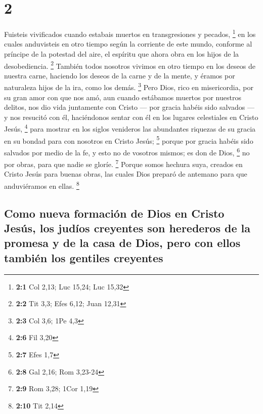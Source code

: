 \hypertarget{section-1}{%
\section{2}\label{section-1}}

 Fuisteis vivificados cuando estabais muertos en
transgresiones y pecados, \footnote{\textbf{2:1} Col 2,13; Luc 15,24;
  Luc 15,32}  en los cuales anduvisteis en otro tiempo
según la corriente de este mundo, conforme al príncipe de la potestad
del aire, el espíritu que ahora obra en los hijos de la desobediencia.
\footnote{\textbf{2:2} Tit 3,3; Efes 6,12; Juan 12,31} 
También todos nosotros vivimos en otro tiempo en los deseos de nuestra
carne, haciendo los deseos de la carne y de la mente, y éramos por
naturaleza hijos de la ira, como los demás. \footnote{\textbf{2:3} Col
  3,6; 1Pe 4,3}  Pero Dios, rico en misericordia, por su
gran amor con que nos amó,  aun cuando estábamos muertos
por nuestros delitos, nos dio vida juntamente con Cristo --- por gracia
habéis sido salvados ---  y nos resucitó con él,
haciéndonos sentar con él en los lugares celestiales en Cristo Jesús,
\footnote{\textbf{2:6} Fil 3,20}  para mostrar en los
siglos venideros las abundantes riquezas de su gracia en su bondad para
con nosotros en Cristo Jesús; \footnote{\textbf{2:7} Efes 1,7}
 porque por gracia habéis sido salvados por medio de la
fe, y esto no de vosotros mismos; es don de Dios, \footnote{\textbf{2:8}
  Gal 2,16; Rom 3,23-24}  no por obras, para que nadie se
gloríe. \footnote{\textbf{2:9} Rom 3,28; 1Cor 1,19} 
Porque somos hechura suya, creados en Cristo Jesús para buenas obras,
las cuales Dios preparó de antemano para que anduviéramos en ellas.
\footnote{\textbf{2:10} Tit 2,14}

\hypertarget{como-nueva-formaciuxf3n-de-dios-en-cristo-jesuxfas-los-juduxedos-creyentes-son-herederos-de-la-promesa-y-de-la-casa-de-dios-pero-con-ellos-tambiuxe9n-los-gentiles-creyentes}{%
\subsection{Como nueva formación de Dios en Cristo Jesús, los judíos
creyentes son herederos de la promesa y de la casa de Dios, pero con
ellos también los gentiles
creyentes}\label{como-nueva-formaciuxf3n-de-dios-en-cristo-jesuxfas-los-juduxedos-creyentes-son-herederos-de-la-promesa-y-de-la-casa-de-dios-pero-con-ellos-tambiuxe9n-los-gentiles-creyentes}}

